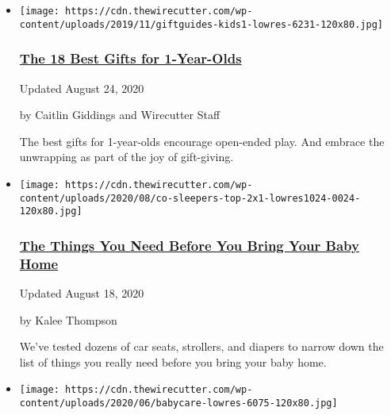 \begin{itemize}
\item
  \href{https://www.nytimes3xbfgragh.onion/wirecutter/gifts/best-gifts-toys-for-1-year-olds/}{}

  \texttt{[image: https://cdn.thewirecutter.com/wp-content/uploads/2019/11/giftguides-kids1-lowres-6231-120x80.jpg]}

  \hypertarget{the-18-best-gifts-for-1-year-olds}{%
  \subsubsection{\texorpdfstring{\href{https://www.nytimes3xbfgragh.onion/wirecutter/gifts/best-gifts-toys-for-1-year-olds/}{The
  18 Best Gifts for
  1-Year-Olds}}{The 18 Best Gifts for 1-Year-Olds}}\label{the-18-best-gifts-for-1-year-olds}}

  Updated August 24, 2020

  by Caitlin Giddings and Wirecutter Staff

  The best gifts for 1-year-olds encourage open-ended play. And embrace
  the unwrapping as part of the joy of gift-giving.
\item
  \href{https://www.nytimes3xbfgragh.onion/wirecutter/lists/the-things-you-need-before-you-bring-your-baby-home/}{}

  \texttt{[image: https://cdn.thewirecutter.com/wp-content/uploads/2020/08/co-sleepers-top-2x1-lowres1024-0024-120x80.jpg]}

  \hypertarget{the-things-you-need-before-you-bring-your-baby-home}{%
  \subsubsection{\texorpdfstring{\href{https://www.nytimes3xbfgragh.onion/wirecutter/lists/the-things-you-need-before-you-bring-your-baby-home/}{The
  Things You Need Before You Bring Your Baby
  Home}}{The Things You Need Before You Bring Your Baby Home}}\label{the-things-you-need-before-you-bring-your-baby-home}}

  Updated August 18, 2020

  by Kalee Thompson

  We've tested dozens of car seats, strollers, and diapers to narrow
  down the list of things you really need before you bring your baby
  home.
\item
  \href{https://www.nytimes3xbfgragh.onion/wirecutter/reviews/baby-care-essentials/}{}

  \texttt{[image: https://cdn.thewirecutter.com/wp-content/uploads/2020/06/babycare-lowres-6075-120x80.jpg]}


\end{itemize}
